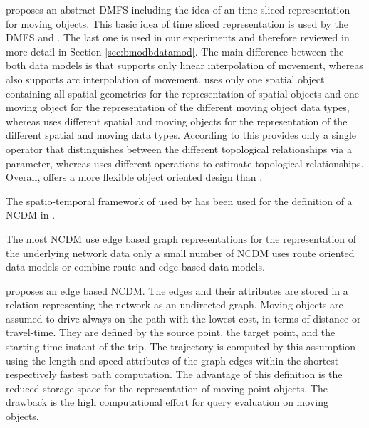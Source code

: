 \documentclass[a4paper]{article}
\begin{document}
\cite{RepresentingMovingObjectsGueting} proposes an abstract DMFS including the
idea of an time sliced representation for moving objects. This basic idea of
time sliced representation is used by the DMFS \cite{STAUPelekis} and
\cite{DataModelDataStructureGueting}. The last one is used in our experiments
and therefore reviewed in more detail in Section \ref{sec:bmodbdatamod}.
The main difference between the both data models is that
\cite{DataModelDataStructureGueting} supports only linear interpolation of movement,
whereas \cite{STAUPelekis} also supports arc interpolation of movement.
\cite{STAUPelekis} uses only one spatial object
containing all spatial geometries for the representation of spatial objects and
one moving object for the representation of the different moving object data types,
whereas \cite{DataModelDataStructureGueting} uses different spatial and moving
objects for the representation of the different spatial and moving data types.
According to this \cite{STAUPelekis} provides only a single operator that
distinguishes
between the different topological relationships via a parameter, whereas
\cite{DataModelDataStructureGueting} uses different operations to estimate
topological relationships. Overall, \cite{STAUPelekis} offers a more flexible
object oriented design than \cite{DataModelDataStructureGueting}.

The spatio-temporal framework of \cite{RepresentingMovingObjectsGueting} used by
\cite{DataModelDataStructureGueting} has been used for the definition of a
NCDM in \cite{NetworkGueting}.

The most NCDM use edge based graph representations for the representation of the
underlying network data only a small number of NCDM uses route oriented data models
or combine route and edge based data models.

\cite{NetworkVazirgiannis} proposes an edge based NCDM. The edges and their
attributes
are stored in a relation representing the network as an undirected graph. Moving
objects are assumed to drive always on the path with the lowest cost,
in terms of distance or travel-time. They are defined by the source point, the
target point, and the starting time instant of the trip. The trajectory is
computed by this assumption using the length and speed attributes of the graph
edges within the shortest respectively fastest path computation.
The advantage of this definition is the reduced storage space for the representation
of moving point objects. The drawback is the high computational effort for query
evaluation on moving objects.
\end{document}
